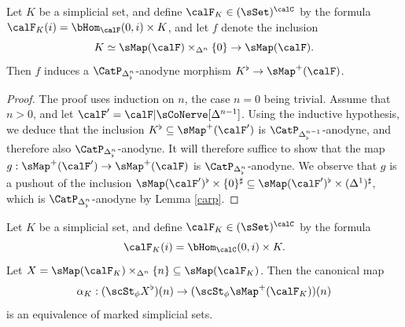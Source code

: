 \begin{lemma}\label{toughboy}
Let $K$ be a simplicial set, and define $\calF_{K} \in (\sSet)^{\calC}$ by
the formula $\calF_{K}(i) = \bHom_{\calF}(0,i) \times K$, and let $f$ denote the inclusion
$$ K \simeq \sMap(\calF) \times_{ \Delta^n } \{0\} \rightarrow \sMap(\calF).$$
Then $f$ induces a $\CatP_{\Delta^n_{\flat}}$-anodyne morphism
$K^{\flat} \rightarrow \sMap^{+}(\calF)$.
\end{lemma}

\begin{proof}
The proof uses induction on $n$, the case $n=0$ being trivial. Assume that
$n > 0$, and let $\calF' = \calF | \sCoNerve[ \Delta^{n-1} ]$. Using the inductive hypothesis, we deduce that the inclusion $K^{\flat} \subseteq \sMap^{+}(\calF')$ is $\CatP_{\Delta^{n-1}_{\flat}}$-anodyne, and therefore also $\CatP_{\Delta^{n}_{\flat}}$-anodyne. It will therefore suffice to show that the map $g: \sMap^{+}(\calF') \rightarrow \sMap^{+}(\calF)$ is $\CatP_{\Delta^{n}_{\flat}}$-anodyne.
We observe that $g$ is a pushout of the inclusion $\sMap(\calF')^{\flat} \times \{0\}^{\sharp}
\subseteq \sMap( \calF')^{\flat} \times (\Delta^1)^{\sharp}$, which is $\CatP_{\Delta^{n}_{\flat}}$-anodyne by Lemma \ref{carp}.
\end{proof}

\begin{lemma}\label{maincase}
Let $K$ be a simplicial set, and define $\calF_{K} \in (\sSet)^{\calC}$ by the formula
$$ \calF_{K}(i) = \bHom_{\calC}(0,i) \times K.$$
Let $X = \sMap( \calF_{K}) \times_{ \Delta^n} \{n\} \subseteq \sMap(\calF_{K})$. Then the canonical map
$$\alpha_{K}: (\scSt_{\phi} X^{\flat})(n) \rightarrow (\scSt_{\phi} \sMap^{+}(\calF_{K}))(n)$$
is an equivalence of marked simplicial sets.
\end{lemma}


